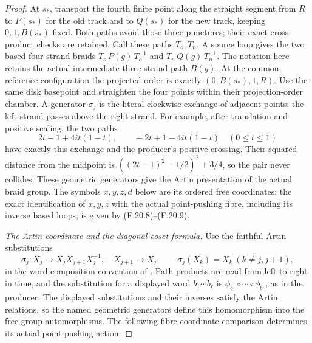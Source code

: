 \begin{proof}
At $s_*$, transport the fourth finite point along the
straight segment from $R$ to $P(s_*)$ for the old track
and to $Q(s_*)$ for the new track, keeping $0,1,B(s_*)$
fixed. Both paths avoid those three punctures; their
exact cross-product checks are retained. Call these
paths $T_o,T_n$. A source loop gives the two based
four-strand braids
$T_o\,P(g)\,T_o^{-1}$ and $T_n\,Q(g)\,T_n^{-1}$.
The notation here retains the actual intermediate
three-strand path $B(g)$.
At the common reference configuration the projected
order is exactly $(0,B(s_*),1,R)$.
Use the same disk basepoint and straighten the four
points within their projection-order chamber. A generator
$\sigma_j$ is the literal clockwise exchange of adjacent
points: the left strand passes above the right strand.
For example, after translation and positive scaling, the
two paths
\[
 2t-1+4it(1-t),\qquad -2t+1-4it(1-t)
       \quad(0\leq t\leq1)
\]
have exactly this exchange and the producer's positive
crossing. Their squared distance from the midpoint is
$((2t-1)^2-1/2)^2+3/4$, so the pair never collides.
These geometric generators give the Artin presentation
of the actual braid group. The symbols $x,y,z,d$ below
are its ordered free coordinates; the exact identification
of $x,y,z$ with the actual point-pushing fibre, including
its inverse based loops, is given by (F.20.8)--(F.20.9).

\emph{The Artin coordinate and the diagonal-coset formula.}
Use the faithful Artin substitutions
\[
 \sigma_j:
 X_j\longmapsto X_jX_{j+1}X_j^{-1},\quad
 X_{j+1}\longmapsto X_j ,
 \qquad \sigma_j(X_k)=X_k\ (k\ne j,j+1),
                                                               \tag{F.20.7}
\]
in the word-composition convention of \cite{A-Artin1947}.
Path products are read from left to right in time, and
the substitution for a displayed word $b_1\cdots b_r$
is $\phi_{b_1}\circ\cdots\circ\phi_{b_r}$, as in the
producer. The displayed substitutions and their inverses
satisfy the Artin relations, so the named geometric
generators define this homomorphism into the free-group
automorphisms. The following fibre-coordinate comparison
determines its actual point-pushing action.


\end{proof}
